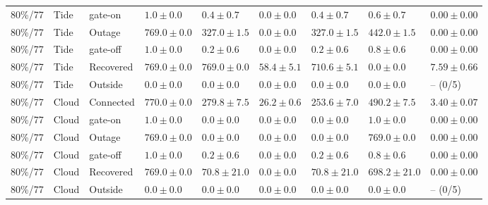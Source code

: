 \begin{table}[!htbp]
{\begin{tabular}{lllllllll}
80\%/77 & Tide & gate-on & $1.0\pm0.0$ & $0.4\pm0.7$ & $0.0\pm0.0$ & $0.4\pm0.7$ & $0.6\pm0.7$ & $0.00\pm0.00$ \\
80\%/77 & Tide & Outage & $769.0\pm0.0$ & $327.0\pm1.5$ & $0.0\pm0.0$ & $327.0\pm1.5$ & $442.0\pm1.5$ & $0.00\pm0.00$ \\
80\%/77 & Tide & gate-off & $1.0\pm0.0$ & $0.2\pm0.6$ & $0.0\pm0.0$ & $0.2\pm0.6$ & $0.8\pm0.6$ & $0.00\pm0.00$ \\
80\%/77 & Tide & Recovered & $769.0\pm0.0$ & $769.0\pm0.0$ & $58.4\pm5.1$ & $710.6\pm5.1$ & $0.0\pm0.0$ & $7.59\pm0.66$ \\
80\%/77 & Tide & Outside & $0.0\pm0.0$ & $0.0\pm0.0$ & $0.0\pm0.0$ & $0.0\pm0.0$ & $0.0\pm0.0$ & -- (0/5) \\
80\%/77 & Cloud & Connected & $770.0\pm0.0$ & $279.8\pm7.5$ & $26.2\pm0.6$ & $253.6\pm7.0$ & $490.2\pm7.5$ & $3.40\pm0.07$ \\
80\%/77 & Cloud & gate-on & $1.0\pm0.0$ & $0.0\pm0.0$ & $0.0\pm0.0$ & $0.0\pm0.0$ & $1.0\pm0.0$ & $0.00\pm0.00$ \\
80\%/77 & Cloud & Outage & $769.0\pm0.0$ & $0.0\pm0.0$ & $0.0\pm0.0$ & $0.0\pm0.0$ & $769.0\pm0.0$ & $0.00\pm0.00$ \\
80\%/77 & Cloud & gate-off & $1.0\pm0.0$ & $0.2\pm0.6$ & $0.0\pm0.0$ & $0.2\pm0.6$ & $0.8\pm0.6$ & $0.00\pm0.00$ \\
80\%/77 & Cloud & Recovered & $769.0\pm0.0$ & $70.8\pm21.0$ & $0.0\pm0.0$ & $70.8\pm21.0$ & $698.2\pm21.0$ & $0.00\pm0.00$ \\
80\%/77 & Cloud & Outside & $0.0\pm0.0$ & $0.0\pm0.0$ & $0.0\pm0.0$ & $0.0\pm0.0$ & $0.0\pm0.0$ & -- (0/5) \\
\bottomrule
\end{tabular}}
\end{table}

